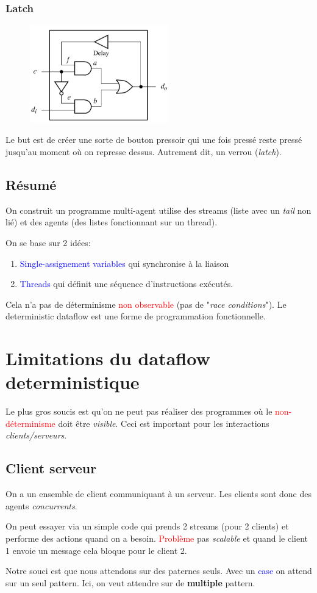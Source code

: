\documentclass{report}
\begin{document}
\subsubsection{Latch}
\begin{figure}[H]
\centering
\includegraphics[width=6cm]{img/latch.png}
\end{figure}
Le but est de créer une sorte de bouton pressoir qui une fois pressé reste pressé jusqu'au moment où on represse dessus. Autrement dit, un verrou (\textit{latch}).

\subsection{Résumé}
On construit un programme multi-agent utilise des streams (liste avec un \textit{tail} non lié) et des agents (des listes fonctionnant sur un thread).\par
On se base sur 2 idées:
\begin{enumerate}
\item \textcolor{blue}{Single-assignement variables} qui synchronise à la liaison
\item \textcolor{blue}{Threads} qui définit une séquence d'instructions exécutés.
\end{enumerate}
Cela n'a pas de déterminisme \textcolor{red}{non observable} (pas de "\textit{race conditions}"). Le deterministic dataflow est une forme de programmation fonctionnelle.

\section{Limitations du dataflow deterministique}
Le plus gros soucis est qu'on ne peut pas réaliser des programmes où le \textcolor{red}{non-déterminisme } doit être \textit{visible}. Ceci est important pour les interactions \textit{clients/serveurs}.

\subsection{Client serveur}
On a un ensemble de client communiquant à un serveur. Les clients sont donc des agents \textit{concurrents}. \par 
On peut essayer via un simple code qui prends 2 streams (pour 2 clients) et performe des actions quand on a besoin. \textcolor{red}{Problème} pas \textit{scalable} et quand le client 1 envoie un message cela bloque pour le client 2.\par 
Notre souci est que nous attendons sur des paternes seuls. Avec un \textcolor{blue}{case} on attend sur un seul pattern. Ici, on veut attendre sur de \textbf{multiple} pattern.
\end{document}
